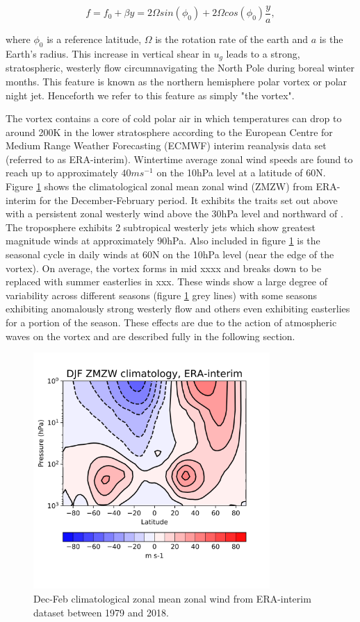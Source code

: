 \begin{equation} \label{eq:beta_plane_approx}
f = f_0 + \beta y = 2 \Omega sin(\phi_0) + 2 \Omega cos(\phi_0)\frac{ y}{a},
\end{equation}

\noindent where $\phi_0$ is a reference latitude, $\Omega$ is the rotation rate of the earth and $a$ is the Earth's radius. This increase in vertical shear in $u_g$ leads to a strong, stratospheric, westerly flow circumnavigating the North Pole during boreal winter months. This feature is known as the northern hemisphere polar vortex or polar night jet. Henceforth we refer to this feature as simply "the vortex".

The vortex contains a core of cold polar air in which temperatures can drop to around 200K in the lower stratosphere according to the European Centre for Medium Range Weather Forecasting (ECMWF) interim reanalysis data set (referred to as ERA-interim). Wintertime average zonal wind speeds are found to reach up to approximately $40ms^{-1}$ on the 10hPa level at a latitude of 60N. Figure \ref{fig:ERAclimDJF} shows the climatological zonal mean zonal wind (ZMZW) from ERA-interim for the December-February period. It exhibits the traits set out above with a persistent zonal westerly wind above the 30hPa level and northward of . The troposphere exhibits 2 subtropical westerly jets which show greatest magnitude winds at approximately 90hPa. Also included in figure \ref{fig:ERAclimDJF} is the seasonal cycle in daily winds at 60N on the 10hPa level (near the edge of the vortex). On average, the vortex forms in mid xxxx and breaks down to be replaced with summer easterlies in xxx. These winds show a large degree of variability across different seasons (figure \ref{fig:ERAclimDJF} grey lines) with some seasons exhibiting anomalously strong westerly flow and others even exhibiting easterlies for a portion of the season. These effects are due to the action of atmospheric waves on the vortex and are described fully in the following section. 


\begin{figure}[h!]
\centering
    \includegraphics[width= 9cm]{Figures/Figures-background/fig1_for_transfer.png}
    \caption{Dec-Feb climatological zonal mean zonal wind from ERA-interim dataset between 1979 and 2018.}
    \label{fig:ERAclimDJF}
\centering
\end{figure}

